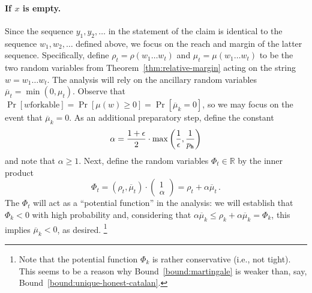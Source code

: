 \paragraph{If $x$ is empty.}
Since the sequence $y_1, y_2, \ldots$ in the statement of the claim 
is identical to the sequence $w_1, w_2, \ldots$ defined above, 
we focus on the reach and margin of the latter sequence. 
Specifically, define $\rho_t = \rho(w_1 \ldots w_t)$ and
$\mu_t = \mu(w_1 \ldots w_t)$ to be the two random variables from
Theorem~\ref{thm:relative-margin} acting on the string $w=w_1 \ldots w_t$. The
analysis will rely on the ancillary random variables
$\overline{\mu}_t = \min(0,\mu_t)$.  Observe that $\Pr[\text{$w$
  forkable}] = \Pr[\mu(w) \geq 0] = \Pr[\overline{\mu}_k = 0]$, so we
may focus on the event that $\overline{\mu}_k = 0$. As an additional
preparatory step, define the constant
\begin{equation}\label{eq:martingale-alpha}  
  \alpha = \frac{1+\epsilon}{2} \cdot \max\left( \frac{1}{\epsilon}, \frac{1}{p_{\mathtt{h}}} \right)
\end{equation}
and note that $\alpha \geq 1$. 
Next, define the random
variables $\Phi_t \in \mathbb{R}$ by the inner product
  \[
    \Phi_t = (\rho_t, \overline{\mu}_t) \cdot
    \left(\begin{array}{c} 1\\ \alpha\end{array}\right) = \rho_t +
    \alpha \overline{\mu}_t\,.
  \]
  The $\Phi_t$ will act as a ``potential function'' in the analysis:
  we will establish that $\Phi_k < 0$ with high probability and,
  considering that
  $\alpha\overline{\mu}_k \leq \rho_k + \alpha \overline{\mu}_k =
  \Phi_k$, this implies $\overline{\mu}_k < 0$, as desired. \footnote{
    Note that the potential function $\Phi_k$ is rather conservative (i.e., not tight). 
    This seems to be a reason why Bound~\ref{bound:martingale} 
    is weaker than, say, Bound~\ref{bound:unique-honest-catalan}.
  }


